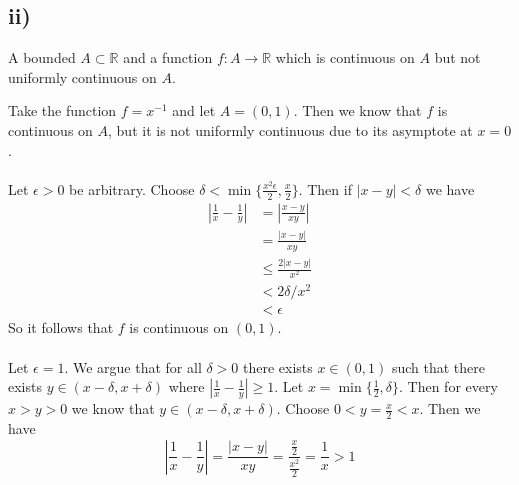 \documentclass{article}
\theoremstyle{definition}
\begin{document}
    \subsection*{ii)}
        \begin{mdframed}
            A bounded $A \subset \mathbb{R}$ and a function $f:A \rightarrow \mathbb{R}$ which is continuous on $A$
            but not uniformly continuous on $A$.
        \end{mdframed}
        Take the function $f = x^{-1}$ and let $A = (0,1)$.
        Then we know that $f$ is continuous on $A$, but it is not uniformly continuous due to its 
        asymptote at $x = 0$.\\\\
        Let $\epsilon > 0$ be arbitrary. Choose $\delta < \min\{\frac{x^2\epsilon}{2}, \frac{x}{2}\}$. Then if $|x - y|<\delta $ we have 
        \begin{align*}
            \left|\frac{1}{x} - \frac{1}{y}\right| &= \left|\frac{x-y}{xy}\right|\\
            &= \frac{|x-y|}{xy} \\
            &\leqslant \frac{2|x-y|}{x^2} \\
            &< 2\delta / x^2 \\
            &< \epsilon
        \end{align*}
        So it follows that $f$ is continuous on $(0,1)$.
        \\\\
        Let $\epsilon = 1$. We argue that for all $\delta > 0$ there exists $x\in (0,1)$ such that there exists $y \in (x-\delta, x+\delta)$
        where $\left|\frac{1}{x} - \frac{1}{y}\right| \geqslant 1$. Let $x = \min\{\frac{1}{2}, \delta\}$. Then for every $x > y > 0$ we know that $y \in (x - \delta, x + \delta)$.
        Choose $0 < y = \frac{x}{2} < x$. Then we have 
        \[
            \left|\frac{1}{x}-\frac{1}{y}\right| = \frac{|x -y|}{xy} = \frac{\frac{x}{2}}{\frac{x^2}{2}} = \frac{1}{x} > 1
        \]
\end{document}
